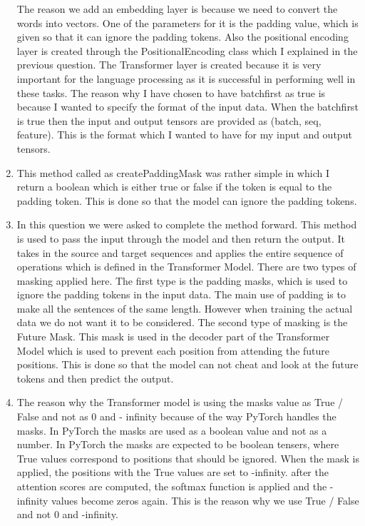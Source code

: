 \documentclass[a4paper]{article}
\begin{document}
\begin{enumerate}
          The reason we add an embedding layer is because we need to convert the words into vectors. One of the parameters for it is the padding value, which is given so that it can ignore the padding tokens. Also the positional encoding layer is created through the PositionalEncoding class which I explained in the previous question. The Transformer layer is created because it is very important for the language processing as it is successful in performing well in these tasks. The reason why I have chosen to have batchfirst as true is because I wanted to specify the format of the input data. When the batchfirst is true then the input and output tensors are provided as (batch, seq, feature). This is the format which I wanted to have for my input and output tensors.
    \item This method called as createPaddingMask was rather simple in which I return a boolean which is either true or false if the token is equal to the padding token. This is done so that the model can ignore the padding tokens.
    \item In this question we were asked to complete the method forward. This method is used to pass the input through the model and then return the output. It takes in the source and target sequences and applies the entire sequence of operations which is defined in the Transformer Model. There are two types of masking applied here. The first type is the padding masks, which is used to ignore the padding tokens in the input data. The main use of padding is to make all the sentences of the same length. However when training the actual data we do not want it to be considered. The second type of masking is the Future Mask. This mask is used in the decoder part of the Transformer Model which is used to prevent each position from attending the future positions. This is done so that the model can not cheat and look at the future tokens and then predict the output.
    \item The reason why the Transformer model is using the masks value as True / False and not as 0 and - infinity because of the way PyTorch handles the masks. In PyTorch the masks are used as a boolean value and not as a number. In PyTorch the masks are expected to be boolean tensers, where True values correspond to positions that should be ignored. When the mask is applied, the positions with the True values are set to -infinity. after the attention scores are computed, the softmax function is applied and the -infinity values become zeros again. This is the reason why we use True / False and not 0 and -infinity.
\end{enumerate}
\end{document}
